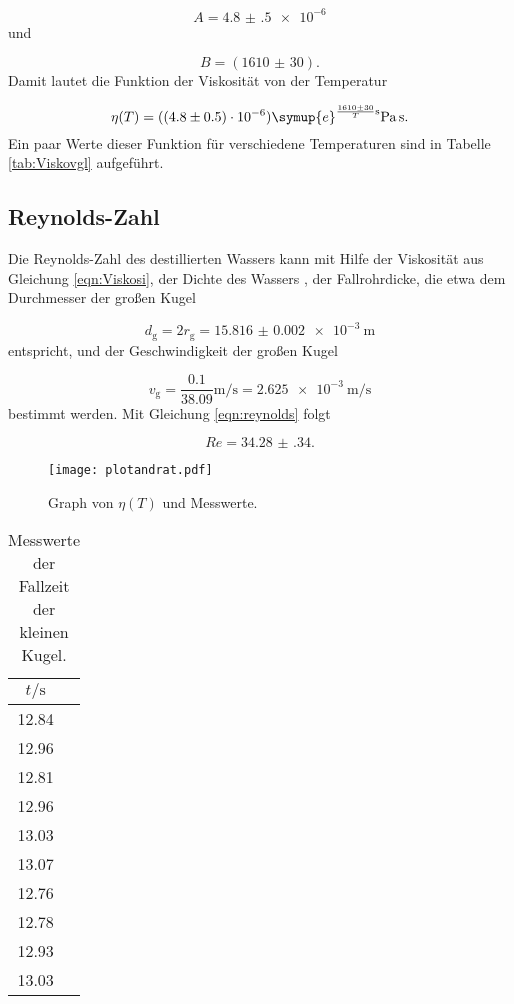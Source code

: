 \begin{equation}
  A = \num{4.8(5)e-6}
\end{equation}
und

\begin{equation}
  B = (\num{1610(30)}).
\end{equation}
Damit lautet die Funktion der Viskosität von der Temperatur

\begin{equation}
  \eta(T) = (\num{4.8(5)e-6}) \symup{e}^{\frac{\num{1610(30)}}{T}\si{\second}}
  \si{\pascal\second}.
\end{equation}
Ein paar Werte dieser Funktion für verschiedene Temperaturen sind in
Tabelle \ref{tab:Viskovgl} aufgeführt.

\subsection{Reynolds-Zahl}

Die Reynolds-Zahl des destillierten Wassers kann mit Hilfe der Viskosität aus
Gleichung \eqref{eqn:Viskosi}, der Dichte des Wassers \cite{Wasserdichte},
der Fallrohrdicke, die etwa dem Durchmesser der großen Kugel

\begin{equation}
  d_\text{g} = 2 r_\text{g} = \SI{15.816(2)e-3}{\meter}
\end{equation}
entspricht, und der Geschwindigkeit der großen Kugel

\begin{equation}
  v_\text{g} = \frac{0.1}{38.09}\si{\meter\per\second} =
  \SI{2.625e-3}{\meter\per\second}
\end{equation}
bestimmt werden.
Mit Gleichung \eqref{eqn:reynolds} folgt

\begin{equation}
  Re = \num{34.28(34)}.
\end{equation}

\begin{figure}
  \centering
  \texttt{[image: plotandrat.pdf]}
  \caption{Graph von $\eta(T)$ und Messwerte.}
  \label{fig:VisTemp}
\end{figure}

\begin{table}[h]
  \centering
  \caption{Messwerte der Fallzeit der kleinen Kugel.}
  \label{tab:klKugel}
  \begin{tabular}{c c}
    \toprule
    $t/\si{\second}$ \\
    \midrule
    12.84 \\
    12.96 \\
    12.81 \\
    12.96 \\
    13.03 \\
    13.07 \\
    12.76 \\
    12.78 \\
    12.93 \\
    13.03 \\
    \bottomrule
  \end{tabular}
\end{table}

